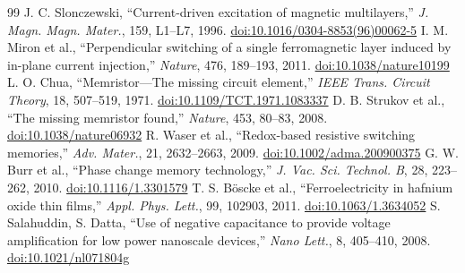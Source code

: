 \documentclass[11pt,a4paper,twoside]{article}
\theoremstyle{definition}\newtheorem{definition}{定义}[section]
\theoremstyle{plain}\newtheorem{theorem}{定理}[section]
\theoremstyle{remark}\newtheorem{remark}{注解}[section]
\begin{document}
\begin{thebibliography}{99}
 J. C. Slonczewski, ``Current-driven excitation of magnetic multilayers,'' \textit{J. Magn. Magn. Mater.}, 159, L1--L7, 1996. \href{https://doi.org/10.1016/0304-8853(96)00062-5}{doi:10.1016/0304-8853(96)00062-5}
 I. M. Miron et al., ``Perpendicular switching of a single ferromagnetic layer induced by in-plane current injection,'' \textit{Nature}, 476, 189--193, 2011. \href{https://doi.org/10.1038/nature10199}{doi:10.1038/nature10199}
 L. O. Chua, ``Memristor—The missing circuit element,'' \textit{IEEE Trans. Circuit Theory}, 18, 507--519, 1971. \href{https://doi.org/10.1109/TCT.1971.1083337}{doi:10.1109/TCT.1971.1083337}
 D. B. Strukov et al., ``The missing memristor found,'' \textit{Nature}, 453, 80--83, 2008. \href{https://doi.org/10.1038/nature06932}{doi:10.1038/nature06932}
 R. Waser et al., ``Redox-based resistive switching memories,'' \textit{Adv. Mater.}, 21, 2632--2663, 2009. \href{https://doi.org/10.1002/adma.200900375}{doi:10.1002/adma.200900375}
 G. W. Burr et al., ``Phase change memory technology,'' \textit{J. Vac. Sci. Technol. B}, 28, 223--262, 2010. \href{https://doi.org/10.1116/1.3301579}{doi:10.1116/1.3301579}
 T. S. B\"{o}scke et al., ``Ferroelectricity in hafnium oxide thin films,'' \textit{Appl. Phys. Lett.}, 99, 102903, 2011. \href{https://doi.org/10.1063/1.3634052}{doi:10.1063/1.3634052}
 S. Salahuddin, S. Datta, ``Use of negative capacitance to provide voltage amplification for low power nanoscale devices,'' \textit{Nano Lett.}, 8, 405--410, 2008. \href{https://doi.org/10.1021/nl071804g}{doi:10.1021/nl071804g}
\end{thebibliography}
\end{document}
